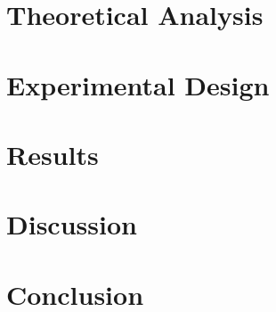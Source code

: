 \documentclass[12pt]{article}
\begin{document}
\section{Theoretical Analysis}


\section{Experimental Design}


\section{Results}


\section{Discussion}


\section{Conclusion}




\end{document}
